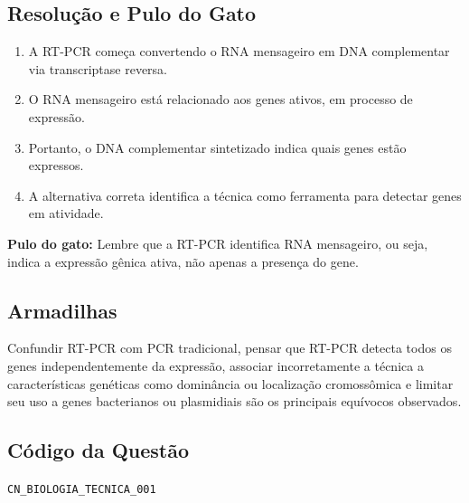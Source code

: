 \documentclass{article}
\begin{document}
\subsection*{Resolução e Pulo do Gato}

\begin{enumerate}
  \item A RT-PCR começa convertendo o RNA mensageiro em DNA complementar via transcriptase reversa.
  \item O RNA mensageiro está relacionado aos genes ativos, em processo de expressão.
  \item Portanto, o DNA complementar sintetizado indica quais genes estão expressos.
  \item A alternativa correta identifica a técnica como ferramenta para detectar genes em atividade.
\end{enumerate}

\textbf{Pulo do gato:} Lembre que a RT-PCR identifica RNA mensageiro, ou seja, indica a expressão gênica ativa, não apenas a presença do gene.

\subsection*{Armadilhas}

Confundir RT-PCR com PCR tradicional, pensar que RT-PCR detecta todos os genes independentemente da expressão, associar incorretamente a técnica a características genéticas como dominância ou localização cromossômica e limitar seu uso a genes bacterianos ou plasmidiais são os principais equívocos observados.

\subsection*{Código da Questão}
\texttt{CN\_BIOLOGIA\_TECNICA\_001}
\end{document}
